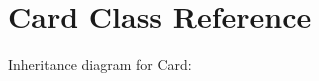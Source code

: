 \hypertarget{classCard}{}\section{Card Class Reference}
\label{classCard}


Inheritance diagram for Card\+:
